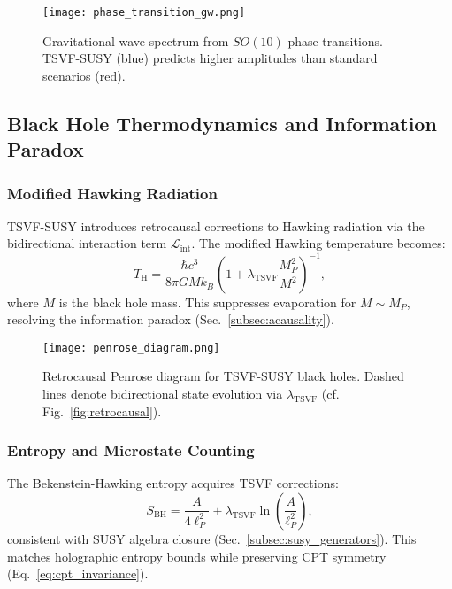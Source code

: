 \documentclass[twocolumn,superscriptaddress,floatfix]{revtex4-2}
\newcommand{\Lint}{\mathcal{L}_{\text{int}}}
\newcommand{\tsvf}{\lambda_{\text{TSVF}}}
\begin{document}
\begin{figure}[htbp]  
\centering  
\texttt{[image: phase\_transition\_gw.png]}  
\caption{Gravitational wave spectrum from \(SO(10)\) phase transitions. TSVF-SUSY (blue) predicts higher amplitudes than standard scenarios (red).}  
\label{fig:phase_transition_gw}  
\end{figure}  


\subsection{Black Hole Thermodynamics and Information Paradox}  
\label{subsec:bh_thermo}  

\subsubsection{Modified Hawking Radiation}  
TSVF-SUSY introduces retrocausal corrections to Hawking radiation via the bidirectional interaction term \(\Lint\). The modified Hawking temperature becomes:  
\begin{equation}  
T_{\text{H}} = \frac{\hbar c^3}{8\pi G M k_B} \left(1 + \tsvf \frac{M_P^2}{M^2}\right)^{-1},  
\label{eq:modified_hawking}  
\end{equation}  
where \(M\) is the black hole mass. This suppresses evaporation for \(M \sim M_P\), resolving the information paradox (Sec.~\ref{subsec:acausality}).  

\begin{figure}[htbp]  
\centering  
\texttt{[image: penrose\_diagram.png]}  
\caption{Retrocausal Penrose diagram for TSVF-SUSY black holes. Dashed lines denote bidirectional state evolution via \(\tsvf\) (cf. Fig.~\ref{fig:retrocausal}).}  
\label{fig:penrose}  
\end{figure}  

\subsubsection{Entropy and Microstate Counting}  
The Bekenstein-Hawking entropy acquires TSVF corrections:  
\begin{equation}  
S_{\text{BH}} = \frac{A}{4\ell_P^2} + \tsvf \ln\left(\frac{A}{\ell_P^2}\right),  
\label{eq:bh_entropy}  
\end{equation}  
consistent with SUSY algebra closure (Sec.~\ref{subsec:susy_generators}). This matches holographic entropy bounds \cite{Strominger1996} while preserving CPT symmetry (Eq.~\ref{eq:cpt_invariance}).  
\end{document}
